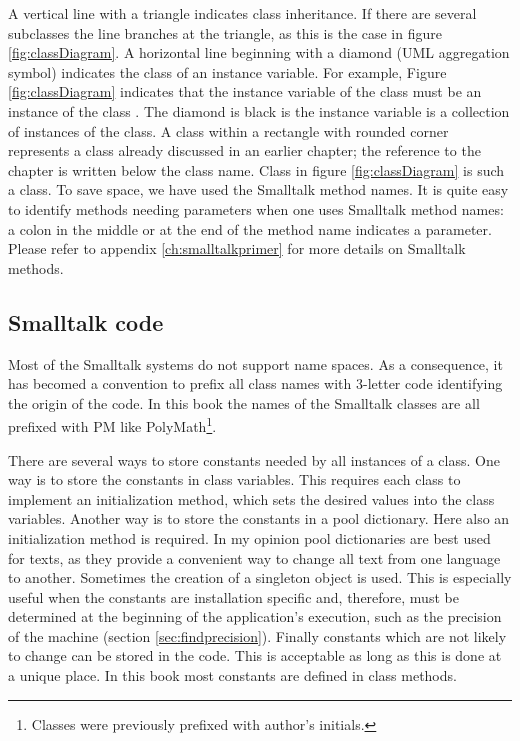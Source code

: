 A vertical line with a triangle indicates class inheritance. If
there are several subclasses the line branches at the triangle, as
this is the case in figure \ref{fig:classDiagram}. A horizontal
line beginning with a diamond (UML aggregation symbol) indicates
the class of an instance variable. For example, Figure
\ref{fig:classDiagram} indicates that the instance variable  of the class  must be an
instance of the class . The diamond is black is
the instance variable is a collection of instances of the class. A
class within a rectangle with rounded corner represents a class
already discussed in an earlier chapter; the reference to the
chapter is written below the class name. Class  in figure \ref{fig:classDiagram} is such a
class. To save space, we have used the
Smalltalk method names. It is quite easy to identify methods
needing parameters when one uses Smalltalk method names: a
colon in the middle or at the end of the method name indicates
a parameter. Please refer to appendix \ref{ch:smalltalkprimer} for
more details on Smalltalk methods.

\subsection{Smalltalk code}
Most of the Smalltalk systems do not support name spaces. As a
consequence, it has becomed a convention to prefix all class names
with 3-letter code identifying the origin of the code. In this
book the names of the Smalltalk classes are all prefixed with PM like PolyMath\footnote{Classes were previously prefixed with author's initials.}.

There are several ways to store constants needed by all instances
of a class. One way is to store the constants in class variables.
This requires each class to implement an initialization method,
which sets the desired values into the class variables. Another
way is to store the constants in a pool dictionary. Here also an
initialization method is required. In my opinion pool dictionaries
are best used for texts, as they provide a convenient way to
change all text from one language to another. Sometimes the
creation of a singleton object is used. This is especially useful
when the constants are installation specific and, therefore, must
be determined at the beginning of the application's execution,
such as the precision of the machine (\cf section
\ref{sec:findprecision}). Finally constants which are not likely
to change can be stored in the code. This is acceptable as long as
this is done at a unique place. In this book most constants are
defined in class methods.


